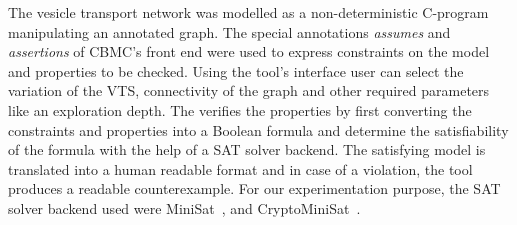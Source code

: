 %
%	
The vesicle transport network was modelled as a non-deterministic C-program manipulating an annotated graph. 
%
The special annotations \textit{assumes} and \textit{assertions} of CBMC's front end were used to express constraints on the model and properties to be checked. 
%
%		
Using the tool's interface user can select the variation of the VTS, connectivity of the graph and other required parameters like an exploration depth.
%
The {\sattool} verifies the properties by first converting the constraints and properties into a Boolean formula and determine the satisfiability of the formula with the help of a SAT solver backend.
%
The satisfying model is translated into a human readable format and in case of a violation, the tool produces a readable counterexample.
For our experimentation purpose, the SAT solver backend used were MiniSat~\cite{sorensson2005minisat}, and CryptoMiniSat~\cite{soos2016cryptominisat}.


